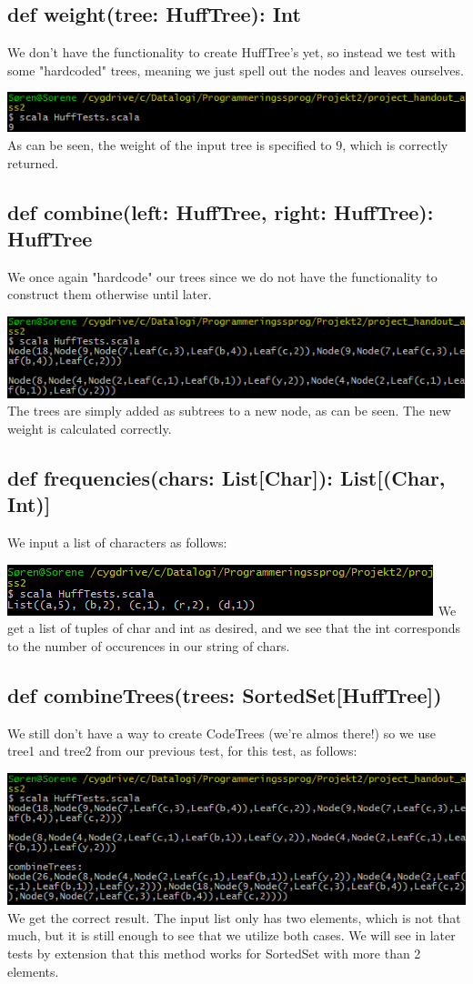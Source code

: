 \documentclass{article}
\begin{document}
\subsection{def weight(tree: HuffTree): Int}
We don't have the functionality to create HuffTree's yet, so instead we test with some "hardcoded" trees, meaning we just spell out the nodes and leaves ourselves. 

\includegraphics{test1.png}
As can be seen, the weight of the input tree is specified to 9, which is correctly returned. 

\subsection{def combine(left: HuffTree, right: HuffTree): HuffTree}
We once again "hardcode" our trees since we do not have the functionality to construct them otherwise until later. 

\includegraphics{test2.png}
The trees are simply added as subtrees to a new node, as can be seen. The new weight is calculated correctly. 


\subsection{def frequencies(chars: List[Char]): List[(Char, Int)]}
We input a list of characters as follows:

\includegraphics{test3.png}
We get a list of tuples of char and int as desired, and we see that the int corresponds to the number of occurences in our string of chars. 

\subsection{def combineTrees(trees: SortedSet[HuffTree])}
We still don't have a way to create CodeTrees (we're almos there!) so we use tree1 and tree2 from our previous test, for this test, as follows:

\includegraphics{test4.png}
We get the correct result.
The input list only has two elements, which is not that much, but it is still enough to see that we utilize both cases. We will see in later tests by extension that this method works for SortedSet with more than 2 elements. 
\end{document}
